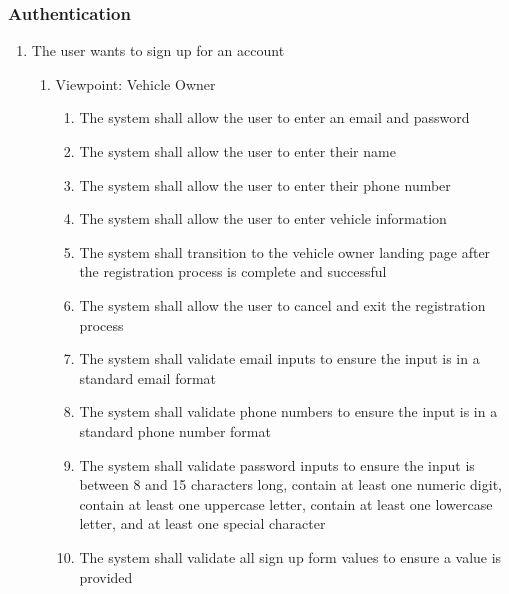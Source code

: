 \documentclass[12pt]{article}
\begin{document}
\subsubsection{Authentication}
\begin{enumerate}[label=BE\arabic*., series=business_events]
	\item The user wants to sign up for an account
	      \begin{enumerate}[VP\arabic*.]
		      \item Viewpoint: Vehicle Owner
		            \begin{enumerate}
			            \item The system shall allow the user to enter an email and password
			            \item The system shall allow the user to enter their name
			            \item The system shall allow the user to enter their phone number
			            \item The system shall allow the user to enter vehicle information
			            \item The system shall transition to the vehicle owner landing page after the registration process is
			                  complete and successful
			            \item The system shall allow the user to cancel and exit the registration process
			            \item The system shall validate email inputs to ensure the input is in a standard email format
			            \item The system shall validate phone numbers to ensure the input is in a standard phone number format
			            \item The system shall validate password inputs to ensure the input is between 8 and 15 characters long,
			                  contain at least one numeric digit, contain at least one uppercase letter, contain at least one
			                  lowercase letter, and at least one special character
			            \item The system shall validate all sign up form values to ensure a value is provided
		            \end{enumerate}


\end{enumerate}
\end{enumerate}
\end{document}
